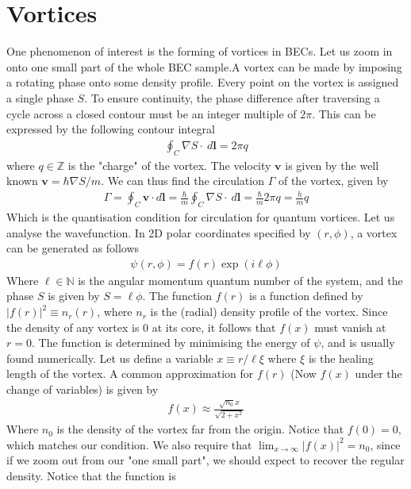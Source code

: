 \documentclass{article}
\newcommand{\ve}{\mathbf}
\begin{document}
\section{Vortices}
 One phenomenon of interest is the forming of vortices in BECs. Let us zoom in onto one small 
part of the whole BEC sample.A vortex can be made by 
imposing a rotating phase onto some density profile. Every point on the vortex is assigned a
single 
phase $S$. To ensure continuity, the phase difference after traversing a cycle across a closed contour must be an integer
 multiple of $2\pi$. This can be expressed by the following contour integral
 \begin{align}
    \oint_C\nabla{S}\cdot\ d\ve{l}=2\pi q
 \end{align}
 where $q\in\mathbb{Z}$ is the "charge" of the vortex. 
The velocity $\ve{v}$ is given by the well known $\ve{v}=\hbar\nabla S/m$. We can thus find the circulation $\Gamma$ of the vortex, 
given by 
\begin{align}
    \Gamma=\oint_C \ve{v}\cdot d\ve{l}= \frac{\hbar}{m}\oint_C\nabla S\cdot\ d\ve{l}=\frac{\hbar}{m}2\pi q=\frac{h}{m}q
\end{align}
Which is the quantisation condition for circulation for quantum vortices. Let us analyse the wavefunction. In 2D polar coordinates 
specified by $(r,\phi)$, a vortex can be generated as follows 
\begin{align}
    \psi(r,\phi)=f(r)\exp(i\ell\phi)
\end{align}
Where $\ell\in\mathbb{N}$ is the angular momentum quantum number of the system, and the phase 
$S$ is given by $S=\ell\phi$. The function 
$f(r)$ is a function defined by $|f(r)|^2\equiv{n_r(r)}$, where $n_r$ is the (radial)
 density profile of the vortex.  Since 
the density of any vortex is 0 at its core, it follows that $f(x)$ must vanish at $r=0$.
The function is determined by minimising the energy of $\psi$, and is usually found numerically. Let us define a 
variable $x\equiv r/\ell\xi$ where $\xi$ is the healing length of the vortex. A common approximation for 
$f(r)$ (Now $ f(x)$ under the change of variables) is given by 
\begin{align}
    f(x)\approx\frac{\sqrt{n_0}x}{\sqrt{2+x^2}}
\end{align}
Where $n_0$ is the density of the vortex far from the origin. Notice that $f(0)=0$, 
which matches our condition. 
We also require that $\lim_{x\to\infty}|f(x)|^2=n_0$, since if we zoom out from our "one small part",  we should 
expect to recover the regular density.  Notice that the function is 
\end{document}

